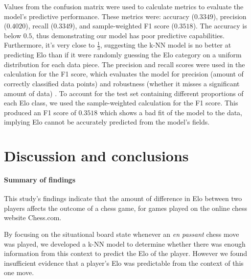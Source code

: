 \documentclass[10pt,a4paper]{article}
\begin{document}
\begin{multicols}{2}
Values from the confusion matrix were used to calculate metrics to evaluate the model's predictive performance. These metrics were: accuracy ($0.3349$), precision ($0.4020$), recall ($0.3349$), and sample-weighted F1 score ($0.3518$). The accuracy is below $0.5$, thus demonstrating our model has poor predictive capabilities. Furthermore, it's very close to $\frac{1}{3}$, suggesting the k-NN model is no better at predicting Elo than if it were randomly guessing the Elo category on a uniform distribution for each data piece. The precision and recall scores were used in the calculation for the F1 score, which evaluates the model for precision (amount of correctly classified data points) and robustness (whether it misses a significant amount of data) \cite{MetricsToEvaluateYourML}. To account for the test set containing different proportions of each Elo class, we used the sample-weighted calculation for the F1 score. This produced an F1 score of $0.3518$ which shows a bad fit of the model to the data, implying Elo cannot be accurately predicted from the model's fields. \newline




\section{Discussion and conclusions}

\paragraph{Summary of findings}
This study's findings indicate that the amount of difference in Elo between two players affects the outcome of a chess game, for games played on the online chess website Chess.com.  \newline

By focusing on the situational board state whenever an \textit{en passant} chess move was played, we developed a k-NN model to determine whether there was enough information from this context to predict the Elo of the player. However we
found insufficient evidence that a player's Elo was predictable from the context of this one move.



\end{multicols}
\end{document}

